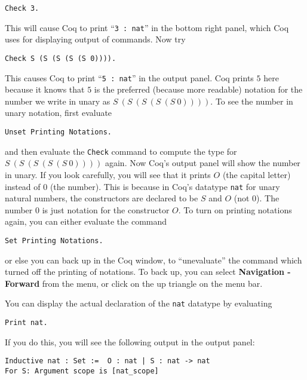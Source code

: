 \documentclass{book}[12pt]
\begin{document}
\begin{verbatim}
Check 3.
\end{verbatim}

\noindent This will cause Coq to print ``\texttt{3 : nat}'' in the bottom
right panel, which Coq uses for displaying output of commands.  Now try

\begin{verbatim}
Check S (S (S (S (S 0)))).
\end{verbatim}

\noindent This causes Coq to print ``\texttt{5 : nat}'' in the output
panel.  Coq prints $5$ here because it knows that $5$ is the preferred
(because more readable) notation for the number we write in unary as
$S\ (S\ (S\ (S\ (S\ 0))))$.  To see the number in unary notation, first
evaluate

\begin{verbatim}
Unset Printing Notations.
\end{verbatim}

\noindent and then evaluate the \texttt{Check} command to compute the
type for $S\ (S\ (S\ (S\ (S\ 0))))$ again.  Now Coq's output panel
will show the number in unary.  If you look carefully, you will see
that it prints $O$ (the capital letter) instead of $0$ (the number).
This is because in Coq's datatype \texttt{nat} for unary natural
numbers, the constructors are declared to be $S$ and $O$ (not $0$).
The number $0$ is just notation for the constructor $O$.  To turn on
printing notations again, you can either evaluate the command

\begin{verbatim}
Set Printing Notations.
\end{verbatim}

\noindent or else you can back up in the Coq window, to ``unevaluate''
the command which turned off the printing of notations.  To back up,
you can select \textbf{Navigation - Forward} from the menu, or click
on the up triangle on the menu bar.
 
You can display the actual declaration of the \texttt{nat} datatype
by evaluating

\begin{verbatim}
Print nat.
\end{verbatim}

\noindent If you do this, you will see the following output in the
output panel:

\begin{verbatim}
Inductive nat : Set :=  O : nat | S : nat -> nat
For S: Argument scope is [nat_scope]
\end{verbatim}
\end{document}
